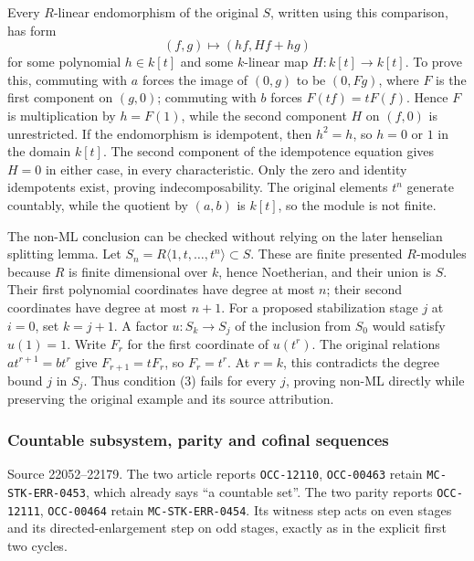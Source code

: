Every \(R\)-linear endomorphism of the original \(S\), written using this comparison, has form \[
(f,g)\longmapsto(hf,Hf+hg)
\] for some polynomial \(h\in k[t]\) and some \(k\)-linear map \(H:k[t]\to k[t]\). To prove this, commuting with \(a\) forces the image of \((0,g)\) to be \((0,Fg)\), where \(F\) is the first component on \((g,0)\); commuting with \(b\) forces \(F(tf)=tF(f)\). Hence \(F\) is multiplication by \(h=F(1)\), while the second component \(H\) on \((f,0)\) is unrestricted. If the endomorphism is idempotent, then \(h^2=h\), so \(h=0\) or \(1\) in the domain \(k[t]\). The second component of the idempotence equation gives \(H=0\) in either case, in every characteristic. Only the zero and identity idempotents exist, proving indecomposability. The original elements \(t^n\) generate countably, while the quotient by \((a,b)\) is \(k[t]\), so the module is not finite.

The non-ML conclusion can be checked without relying on the later henselian splitting lemma. Let \(S_n=R\langle1,t,\ldots,t^n\rangle\subset S\). These are finite presented \(R\)-modules because \(R\) is finite dimensional over \(k\), hence Noetherian, and their union is \(S\). Their first polynomial coordinates have degree at most \(n\); their second coordinates have degree at most \(n+1\). For a proposed stabilization stage \(j\) at \(i=0\), set \(k=j+1\). A factor \(u:S_k\to S_j\) of the inclusion from \(S_0\) would satisfy \(u(1)=1\). Write \(F_r\) for the first coordinate of \(u(t^r)\). The original relations \(at^{r+1}=bt^r\) give \(F_{r+1}=tF_r\), so \(F_r=t^r\). At \(r=k\), this contradicts the degree bound \(j\) in \(S_j\). Thus condition (3) fails for every \(j\), proving non-ML directly while preserving the original example and its source attribution.

\subsubsection{Countable subsystem, parity and cofinal sequences}\label{algebra-proof-013-countable-subsystem-parity-and-cofinal-sequences}

Source 22052--22179. The two article reports \texttt{OCC-12110}, \texttt{OCC-00463} retain \texttt{MC-STK-ERR-0453}, which already says ``a countable set''. The two parity reports \texttt{OCC-12111}, \texttt{OCC-00464} retain \texttt{MC-STK-ERR-0454}. Its witness step acts on even stages and its directed-enlargement step on odd stages, exactly as in the explicit first two cycles.


